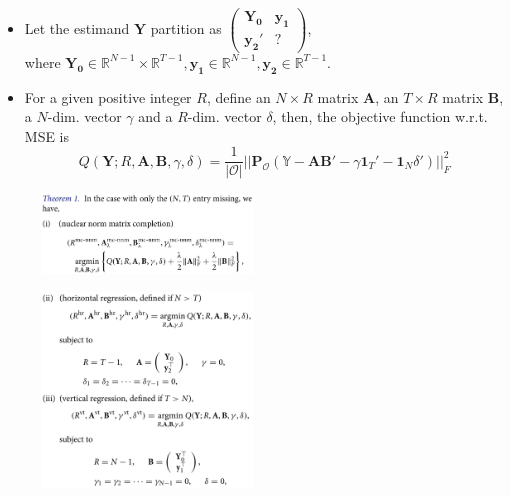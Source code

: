 \documentclass[xcolor=svgnames,aspectratio=169]{beamer}
\newcommand{\R}{\mathbb{R}}
\begin{document}
\begin{frame}
    \begin{itemize}
        \item Let the estimand $\mathbf{Y}$ partition as $
        \begin{pmatrix} \mathbf{Y_0} & \mathbf{y_1} \\ \mathbf{y_2}' & ? \end{pmatrix}$, \\ where $\mathbf{Y_0}\in\R^{N-1}\times \R^{T-1}, \mathbf{y_1}\in\R^{N-1}, \mathbf{y_2}\in\R^{T-1}$.
        \item For a given positive integer $R$, define an $N\times R$ matrix $\mathbf{A}$, an $T\times R$ matrix $\mathbf{B}$, a $N$-dim. vector $\gamma$ and a $R$-dim. vector $\delta$, then, the objective function w.r.t. MSE is
        \[
        Q(\mathbf{Y}; R, \mathbf{A}, \mathbf{B}, \gamma, \delta)=\frac{1}{|\mathcal{O} |} ||\mathbf{P_{\mathcal{O} }}({\mathbb{Y}-\mathbf{AB'}-\gamma}\mathbf{1}_T'-\mathbf{1}_N\delta')||_F^2
        \]
    \end{itemize}
\end{frame}

\begin{frame}
    \begin{figure}
            \includegraphics[width=0.5\textwidth, height=0.5\textheight, keepaspectratio]{MC-NNM.png}
    \end{figure}
\end{frame}

\begin{frame}
    \begin{figure}
            \includegraphics[width=0.5\textwidth, height=0.5\textheight, keepaspectratio]{Hr_Vt.png}
    \end{figure}
\end{frame}
\end{document}
